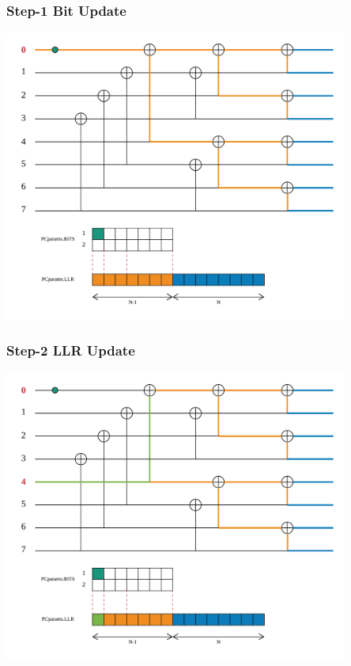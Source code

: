 \documentclass{beamer}
\begin{document}
\begin{frame}
\frametitle{Step-1 Bit Update}
  \begin{center}
  \includegraphics[width=0.85\textwidth]{pics/polar_-_SC_bit_1.png}
  \end{center}
\end{frame}

\begin{frame}
\frametitle{Step-2 LLR Update}
  \begin{center}
  \includegraphics[width=0.85\textwidth]{pics/polar_-_SC_llr_2.png}
  \end{center}
\end{frame}
\end{document}
